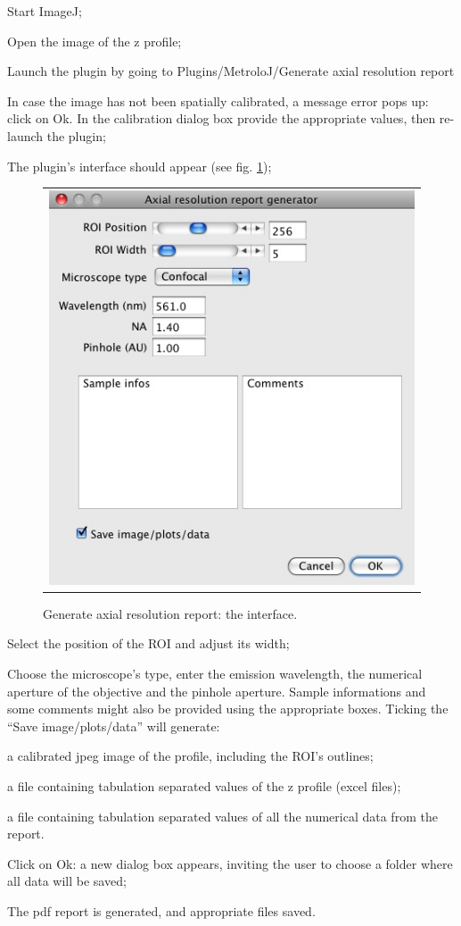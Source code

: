 \documentclass[a4paper, 11pt]{report}%
\begin{document}
\begin{enumerate*}
	\item Start ImageJ;
	\item Open the image of the z profile;
	\item Launch the plugin by going to Plugins/MetroloJ/Generate axial resolution report
	\item In case the image has not been spatially calibrated, a message error pops up: click on Ok. In the calibration dialog box provide the appropriate values, then re-launch the plugin;
	\item The plugin's interface should appear (see fig. \ref{fig:garr-interf}); 
		\begin{figure}[!ht]
			\begin{center}
				\begin{tabular}{c}
					\includegraphics[width=0.35\linewidth]{img/garr-interf}
				\end{tabular}
			\end{center}
			\caption{\label{fig:garr-interf}Generate axial resolution report: the interface.}
		\end{figure} 
	\item Select the position of the ROI and adjust its width;
	\item Choose the microscope's type, enter the emission wavelength, the numerical aperture of the objective and the pinhole aperture. Sample informations and some comments might also be provided using the appropriate boxes. Ticking the ``Save image/plots/data'' will generate:
	\begin{itemize*}
		\item a calibrated jpeg image of the profile, including the ROI's outlines;
		\item a file containing tabulation separated values of the z profile (excel files);
		\item a file containing tabulation separated values of all the numerical data from the report.
	\end{itemize*}
	\item Click on Ok: a new dialog box appears, inviting the user to choose a folder where all data will be saved;
	\item The pdf report is generated, and appropriate files saved.
\end{enumerate*}
\end{document}
